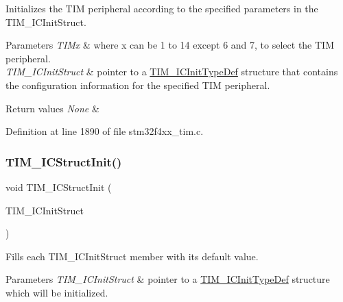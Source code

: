 Initializes the T\+IM peripheral according to the specified parameters in the T\+I\+M\+\_\+\+I\+C\+Init\+Struct. 


\begin{DoxyParams}{Parameters}
{\em T\+I\+Mx} & where x can be 1 to 14 except 6 and 7, to select the T\+IM peripheral. \\
\hline
{\em T\+I\+M\+\_\+\+I\+C\+Init\+Struct} & pointer to a \hyperlink{struct_t_i_m___i_c_init_type_def}{T\+I\+M\+\_\+\+I\+C\+Init\+Type\+Def} structure that contains the configuration information for the specified T\+IM peripheral. \\
\hline
\end{DoxyParams}

\begin{DoxyRetVals}{Return values}
{\em None} & \\
\hline
\end{DoxyRetVals}


Definition at line 1890 of file stm32f4xx\+\_\+tim.\+c.

\mbox{\label{group___t_i_m_ga5005dac8e4e8a4c7fc2a0ef05b77cc50}} 
\subsubsection{\texorpdfstring{T\+I\+M\+\_\+\+I\+C\+Struct\+Init()}{TIM\_ICStructInit()}}
{\footnotesize\ttfamily void T\+I\+M\+\_\+\+I\+C\+Struct\+Init (\begin{DoxyParamCaption}\item[{\hyperlink{struct_t_i_m___i_c_init_type_def}{T\+I\+M\+\_\+\+I\+C\+Init\+Type\+Def} $\ast$}]{T\+I\+M\+\_\+\+I\+C\+Init\+Struct }\end{DoxyParamCaption})}



Fills each T\+I\+M\+\_\+\+I\+C\+Init\+Struct member with its default value. 


\begin{DoxyParams}{Parameters}
{\em T\+I\+M\+\_\+\+I\+C\+Init\+Struct} & pointer to a \hyperlink{struct_t_i_m___i_c_init_type_def}{T\+I\+M\+\_\+\+I\+C\+Init\+Type\+Def} structure which will be initialized. \\
\hline
\end{DoxyParams}

